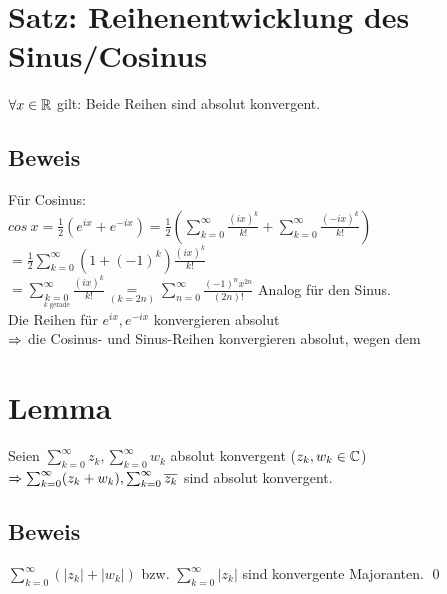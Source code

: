 \section{Satz: Reihenentwicklung des Sinus/Cosinus}\label{8.18}
$\forall x \in \mathbb{R}$ gilt:
Beide Reihen sind absolut konvergent.

\subsection*{Beweis}
Für Cosinus:\\
$cos \ x = \frac{1}{2} (e^{ix} + e^{-ix}) = \frac{1}{2}\left(\sum_{k=0}^\infty \frac{(ix)^k}{k!} + \sum_{k=0}^\infty \frac{(-ix)^k}{k!}\right)$\\
$=\frac{1}{2} \sum_{k=0}^\infty (1+(-1)^k) \frac{(ix)^k}{k!}$\\
$=\sum_{\underset{k \text{ gerade}}{k=0}}^\infty \frac{(ix)^k}{k!} \underset{(k=2n)}{=} \sum_{n=0}^\infty \frac{(-1)^n x^{2n}}{(2n)!}$\nl
Analog für den Sinus.\\
Die Reihen für $e^{ix}, e^{-ix}$ konvergieren absolut\\
$\Rightarrow$ die Cosinus- und Sinus-Reihen konvergieren absolut, wegen dem

\section{Lemma}\label{8.19}
Seien $\sum_{k=0}^\infty z_k, \sum_{k=0}^\infty w_k$ absolut konvergent ($z_k, w_k \in \mathbb{C}$)\\
$\Rightarrow \sum_{k=0}^\infty (z_k+w_k), \sum_{k=0}^\infty \overline{z_k}$ sind absolut konvergent.

\subsection*{Beweis}
$\sum_{k=0}^\infty (|z_k|+|w_k|)$ bzw. $\sum_{k=0}^\infty |z_k|$ sind konvergente Majoranten. \qed

